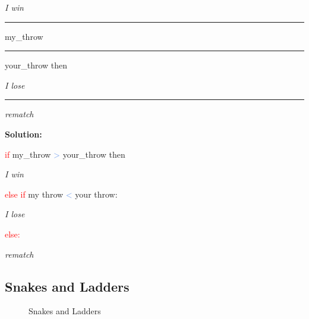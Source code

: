 \hspace{1cm} \textit{I win}

\textcolor{red}{\rule[-0.5ex]{0.7cm}{1pt}} my\_throw \textcolor{CornflowerBlue}{\rule[-0.5ex]{0.7cm}{1pt}} your\_throw then

\hspace{1cm} \textit{I lose}

\textcolor{red}{\rule[-0.5ex]{0.7cm}{1pt}}

\hspace{1cm} \textit{rematch}

\textbf{Solution:}

\textcolor{red}{if} my\_throw \textcolor{CornflowerBlue}{>} your\_throw then

\hspace{1cm} \textit{I win}

\textcolor{red}{else if} my throw \textcolor{CornflowerBlue}{<} your throw:

\hspace{1cm} \textit{I lose}

\textcolor{red}{else:}

\hspace{1cm} \textit{rematch}







\subsection*{Snakes and Ladders}


\begin{figure}[H]
    \caption{Snakes and Ladders}
\end{figure}


